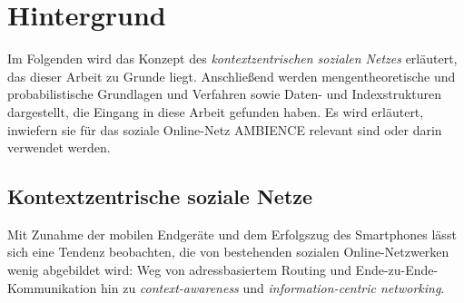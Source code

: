 \chapter{Hintergrund}\label{ch:hintergrund}
Im Folgenden wird das Konzept des \textit{kontextzentrischen sozialen Netzes} erläutert, das dieser Arbeit zu Grunde liegt. Anschließend werden mengentheoretische und probabilistische Grundlagen und Verfahren sowie Daten- und Indexstrukturen dargestellt, die Eingang in diese Arbeit gefunden haben. Es wird erläutert, inwiefern sie für das soziale Online-Netz AMBIENCE relevant sind oder darin verwendet werden. 
\section{Kontextzentrische soziale Netze}\label{sec:kontext}
Mit Zunahme der mobilen Endgeräte und dem Erfolgszug des Smartphones lässt sich eine Tendenz beobachten, die von bestehenden sozialen Online-Netzwerken wenig abgebildet wird: Weg von adressbasiertem Routing und Ende-zu-Ende-Kommunikation hin zu \textit{context-awareness} und \textit{information-centric networking}. 

